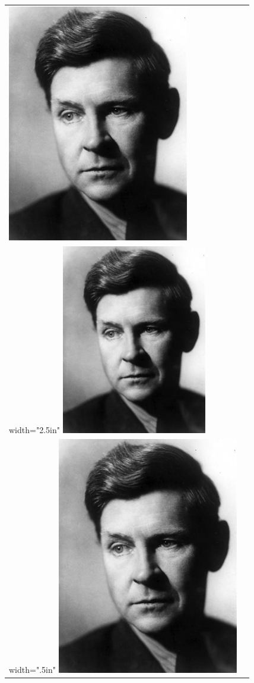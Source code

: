 \documentclass[11pt,twoside]{article}\makeatletter
\begin{document}
\begin{longtable}{P{0.19582814445828145\textwidth}P{0.6541718555417185\textwidth}}
\tabcellsep \noindent\includegraphics[]{portrait.jpg}\\
width="2.5in" \tabcellsep \noindent\includegraphics[width=2.5in,]{portrait.jpg}\\
width=".5in" \tabcellsep \noindent\includegraphics[width=.5in,]{portrait.jpg}\\

\end{longtable}
\end{document}
